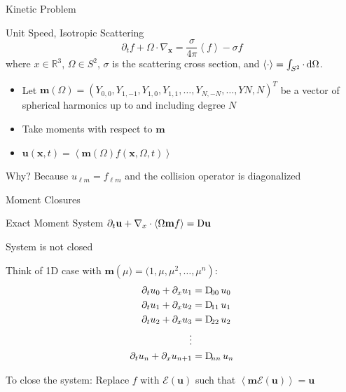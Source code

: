 \documentclass{beamer}
\renewcommand{\vec}[1]{\ensuremath{\mathbf{#1}}}
\newcommand{\integral}[1]{\ensuremath{\left\langle #1 \right\rangle}}
\newcommand{\closure}[1]{\ensuremath{\mathcal{E}(#1)}}
\newcommand{\R}{\ensuremath{\mathbb{R}}\xspace}
\begin{document}
    \begin{frame}{Kinetic Problem}
        \begin{block}{Unit Speed, Isotropic Scattering}
            \begin{equation*}
                \partial_t f + \Omega \cdot \nabla_\vec{x} = \frac{\sigma}{4\pi} \integral{f} - \sigma f
            \end{equation*}
            where $x \in \R^3$, $\Omega \in S^2$, $\sigma$ is the scattering cross section, and $\integral{\cdot} = \int_{S^2} \cdot \dif \Omega$.
        \end{block}

        \vfill

        \begin{itemize}
            \item Let $\vec{m}(\Omega) = \left(Y_{0,0}, Y_{1,-1}, Y_{1,0}, Y_{1,1}, \dots, Y_{N,-N}, \dots, Y{N,N}\right)^T$ be a vector of spherical harmonics up to and including degree $N$
            \item Take moments with respect to \vec{m}
            \item $\vec{u}(\vec{x}, t) = \integral{\vec{m}(\Omega) f(\vec{x}, \Omega, t)}$
        \end{itemize}
        \alert{Why? Because $u_{\ell m} = f_{\ell m}$ and the collision operator is diagonalized}
    \end{frame}

    \begin{frame}{Moment Closures}
        \begin{block}{Exact Moment System}
            $\partial_t \vec{u} + \nabla_x \cdot \integral{\Omega \vec{m} f} = \Dif \vec{u}$
        \end{block}

        \vfill

        System is not closed

        Think of 1D case with $\vec{m}\left(\mu) = (1, \mu, \mu^2, \dots, \mu^n\right)$:
        \begin{align*}
            \partial_t u_0 + \partial_x u_1 &= \Dif_{00} u_0 \\
            \partial_t u_1 + \partial_x u_2 &= \Dif_{11} u_1 \\
            \partial_t u_2 + \partial_x u_3 &= \Dif_{22} u_2 \\
            \vdots \\
            \partial_t u_n + \partial_x u_{n + 1} &= \Dif_{nn} u_n
        \end{align*}

        \vfill

        \alert{To close the system}: Replace $f$ with $\closure{\vec{u}}$ such that $\integral{\vec{m} \closure{\vec{u}}} = \vec{u}$
    \end{frame}
\end{document}
